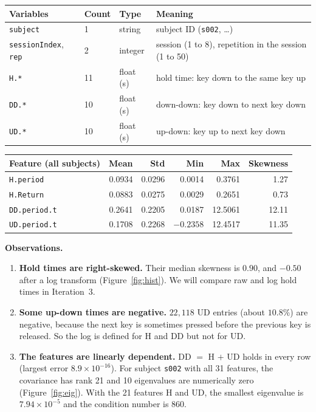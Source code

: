 \documentclass[11pt]{article}
\theoremstyle{plain}
\theoremstyle{definition}
\theoremstyle{remark}
\begin{document}
\begin{table}[H]
\centering\small
\begin{tabular}{@{}llll@{}}
\toprule
Variables & Count & Type & Meaning\\
\midrule
\texttt{subject} & 1 & string & subject ID (\texttt{s002}, \dots)\\
\texttt{sessionIndex}, \texttt{rep} & 2 & integer & session (1 to 8), repetition in the session (1 to 50)\\
\texttt{H.*} & 11 & float (s) & hold time: key down to the same key up\\
\texttt{DD.*} & 10 & float (s) & down-down: key down to next key down\\
\texttt{UD.*} & 10 & float (s) & up-down: key up to next key down\\
\bottomrule
\end{tabular}
\end{table}

\begin{table}[H]
\centering\small
\begin{tabular}{@{}lrrrrr@{}}
\toprule
Feature (all subjects) & Mean & Std & Min & Max & Skewness\\
\midrule
\texttt{H.period} & 0.0934 & 0.0296 & 0.0014 & 0.3761 & 1.27\\
\texttt{H.Return} & 0.0883 & 0.0275 & 0.0029 & 0.2651 & 0.73\\
\texttt{DD.period.t} & 0.2641 & 0.2205 & 0.0187 & 12.5061 & 12.11\\
\texttt{UD.period.t} & 0.1708 & 0.2268 & $-0.2358$ & 12.4517 & 11.35\\
\bottomrule
\end{tabular}
\end{table}

\textbf{Observations.}
\begin{enumerate}[nosep]
\item \textbf{Hold times are right-skewed.} Their median skewness is $0.90$, and
 $-0.50$ after a log transform (Figure~\ref{fig:hist}). We will compare raw and log
 hold times in Iteration~3.
\item \textbf{Some up-down times are negative.} $22{,}118$ UD entries (about $10.8\%$)
 are negative, because the next key is sometimes pressed before the previous key is
 released. So the log is defined for H and DD but not for UD.
\item \textbf{The features are linearly dependent.} DD $=$ H $+$ UD holds in every
 row (largest error $8.9\times10^{-16}$). For subject \texttt{s002} with all 31
 features, the covariance has rank 21 and 10 eigenvalues are numerically zero
 (Figure~\ref{fig:eig}). With the 21 features H and UD, the smallest eigenvalue is
 $7.94\times10^{-5}$ and the condition number is $860$.
\end{enumerate}
\end{document}

